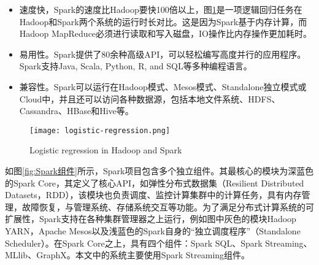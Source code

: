 \begin{itemize}
  \item 速度快，Spark的速度比Hadoop要快100倍以上，图\ref{fig:Logistic regression in Hadoop and Spark}是一项逻辑回归任务在Hadoop和Spark两个系统的运行时长对比。这是因为Spark基于内存计算，而Hadoop MapReduce必须进行读取和写入磁盘，IO操作比内存操作更加耗时。
  \item 易用性。Spark提供了80余种高级API，可以轻松编写高度并行的应用程序。Spark支持Java, Scala, Python, R, and SQL等多种编程语言。
  \item 兼容性。Spark可以运行在Hadoop模式、Mesos模式、Standalone独立模式或Cloud中，并且还可以访问各种数据源，包括本地文件系统、HDFS、Cassandra、HBase和Hive等。
\end{itemize}
\begin{figure}
  \centering
  \texttt{[image: logistic-regression.png]}
  \caption{Logistic regression in Hadoop and Spark}
  \label{fig:Logistic regression in Hadoop and Spark}
\end{figure}


如图\ref{fig:Spark组件}所示，Spark项目包含多个独立组件。其最核心的模块为深蓝色的Spark Core，其定义了核心API，如弹性分布式数据集（Resilient Distributed Datasets，RDD），该模块也负责调度、监控计算集群中的计算任务，具有内存管理，故障恢复，与管理系统、存储系统交互等功能。为了满足分布式计算系统的可扩展性，Spark支持在各种集群管理器之上运行，例如图中灰色的模块Hadoop YARN，Apache Mesos以及浅蓝色的Spark自身的“独立调度程序”（Standalone Scheduler）。在Spark Core之上，具有四个组件：Spark SQL、Spark Streaming、MLlib、GraphX。本文中的系统主要使用Spark Streaming组件。



